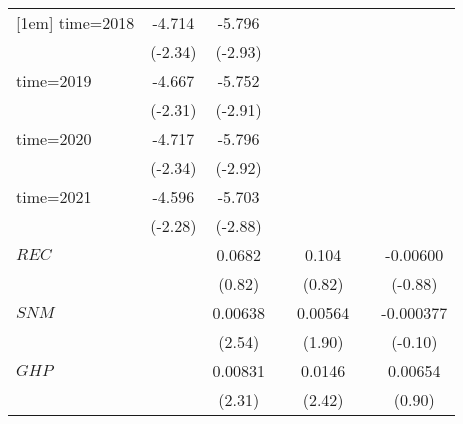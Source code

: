 \begin{table}[htbp]
\begin{tabular}{l*{6}{c}}
[1em]
time=2018           &      -4.714\sym{**} &      -5.796\sym{***}&                     &                     &                     &                     \\
                    &     (-2.34)         &     (-2.93)         &                     &                     &                     &                     \\
[1em]
time=2019           &      -4.667\sym{**} &      -5.752\sym{***}&                     &                     &                     &                     \\
                    &     (-2.31)         &     (-2.91)         &                     &                     &                     &                     \\
[1em]
time=2020           &      -4.717\sym{**} &      -5.796\sym{***}&                     &                     &                     &                     \\
                    &     (-2.34)         &     (-2.92)         &                     &                     &                     &                     \\
[1em]
time=2021           &      -4.596\sym{**} &      -5.703\sym{***}&                     &                     &                     &                     \\
                    &     (-2.28)         &     (-2.88)         &                     &                     &                     &                     \\
[1em]
$ REC $             &                     &      0.0682         &                     &       0.104         &                     &    -0.00600         \\
                    &                     &      (0.82)         &                     &      (0.82)         &                     &     (-0.88)         \\
[1em]
$ SNM $             &                     &     0.00638\sym{**} &                     &     0.00564\sym{*}  &                     &   -0.000377         \\
                    &                     &      (2.54)         &                     &      (1.90)         &                     &     (-0.10)         \\
[1em]
$ GHP $             &                     &     0.00831\sym{**} &                     &      0.0146\sym{**} &                     &     0.00654         \\
                    &                     &      (2.31)         &                     &      (2.42)         &                     &      (0.90)         \\

\end{tabular}
\end{table}
